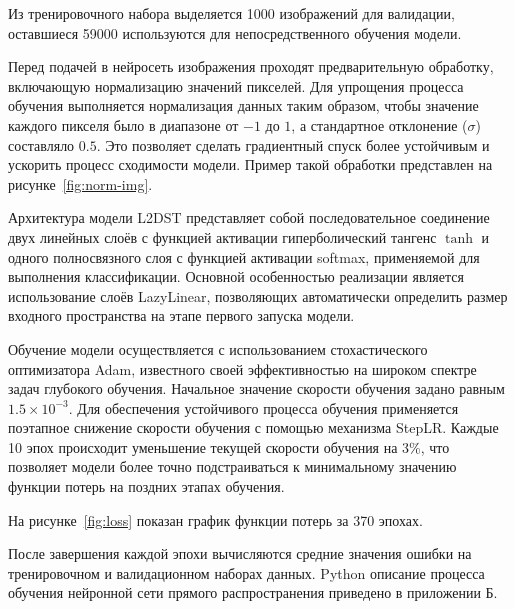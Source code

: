 Из тренировочного набора 
выделяется 1000 изображений для валидации, оставшиеся 59000 используются для 
непосредственного обучения модели. 

Перед подачей в нейросеть изображения проходят предварительную обработку, 
включающую нормализацию значений пикселей. Для упрощения 
процесса обучения выполняется нормализация данных таким образом, чтобы значение 
каждого пикселя было в диапазоне от $-1$ до $1$, а стандартное отклонение 
($\sigma$) составляло $0.5$. Это позволяет сделать градиентный спуск более 
устойчивым и ускорить процесс сходимости модели. Пример такой обработки 
представлен на рисунке~\ref{fig:norm-img}.


Архитектура модели L2DST представляет собой последовательное соединение двух 
линейных слоёв с функцией активации гиперболический тангенс \(\tanh\) и одного 
полносвязного слоя с функцией активации softmax, применяемой для выполнения 
классификации. Основной особенностью реализации является использование слоёв 
LazyLinear, позволяющих автоматически определить размер входного пространства 
на этапе первого запуска модели.

Обучение модели осуществляется с использованием стохастического оптимизатора 
Adam, известного своей эффективностью на широком спектре задач глубокого 
обучения. Начальное значение скорости обучения задано равным 
\(1.5\times10^{-3}\).
Для обеспечения устойчивого процесса обучения применяется поэтапное снижение 
скорости обучения с помощью механизма StepLR. Каждые 10 эпох происходит 
уменьшение текущей скорости обучения на 3\%, что позволяет модели более точно 
подстраиваться к минимальному значению функции потерь на поздних этапах 
обучения.

На рисунке~\ref{fig:loss} показан график функции потерь за 370 эпохах.


После завершения каждой эпохи вычисляются средние значения ошибки на 
тренировочном и валидационном наборах данных.  
Python описание процесса обучения нейронной сети прямого распространения 
приведено в приложении Б.